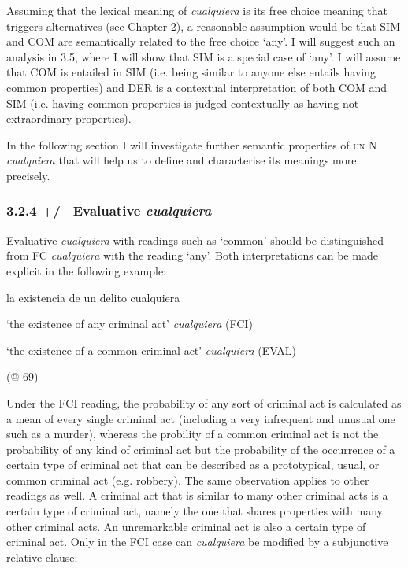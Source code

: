 \documentclass[output=paper]{langscibook}
\begin{document}
  Assuming that the lexical meaning of \textit{cualquiera} is its free choice meaning that triggers alternatives (see Chapter 2), a reasonable assumption would be that SIM and COM are semantically related to the free choice ‘any’. I will suggest such an analysis in 3.5, where I will show that SIM is a special case of ‘any’. I will assume that COM is entailed in SIM (i.e. being similar to anyone else entails having common properties) and DER is a contextual interpretation of both COM and SIM (i.e. having common properties is judged contextually as having not-extraordinary properties).

  In the following section I will investigate further semantic properties of \textsc{un} N \textit{cualquiera} that will help us to define and characterise its meanings more precisely. 

\subsubsection{\textbf{3.2.4} \textbf{+/–} \textbf{Evaluative} \textbf{\textit{cualquiera}}}

Evaluative \textit{cualquiera} with readings such as ‘common’ should be distinguished from FC \textit{cualquiera} with the reading ‘any’. Both interpretations can be made explicit in the following example:

  la existencia de un delito cualquiera

  ‘the existence of any criminal act’                                     \textit{cualquiera} (FCI)

  ‘the existence of a common criminal act’                                    \textit{cualquiera} (EVAL)

  (@ 69)

Under the FCI reading, the probability of any sort of criminal act is calculated as a mean of every single criminal act (including a very infrequent and unusual one such as a murder), whereas the probility of a common criminal act is not the probability of any kind of criminal act but the probability of the occurrence of a certain type of criminal act that can be described as a prototypical, usual, or common criminal act (e.g. robbery). The same observation applies to other readings as well. A criminal act that is similar to many other criminal acts is a certain type of criminal act, namely the one that shares properties with many other criminal acts. An unremarkable criminal act is also a certain type of criminal act. Only in the FCI case can \textit{cualquiera} be modified by a subjunctive relative clause:
\end{document}
